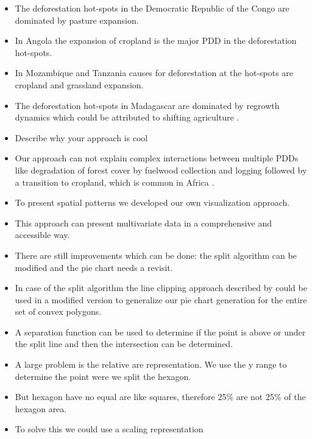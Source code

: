 \begin{itemize}
				\item The deforestation hot-spots in the Democratic Republic of the Congo are dominated by pasture expansion.
				\item In Angola the expansion of cropland is the major \ac{PDD} in the deforestation hot-spots.
				\item In Mozambique and Tanzania causes for deforestation at the hot-spots are cropland and grassland expansion.
				\item The deforestation hot-spots in Madagascar are dominated by regrowth dynamics which could be attributed to shifting agriculture \citep{Curtis2018}.

				\item Describe why your approach is cool
				\item Our approach can not explain complex interactions between multiple \acp{PDD} like degradation of forest cover by fuelwood collection and logging followed by a transition to cropland, which is common in Africa \citep{Geist2001,Cabral2011}.

				\item To present spatial patterns we developed our own visualization approach.
				\item This approach can present multivariate data in a comprehensive and accessible way.
				\item There are still improvements which can be done: the split algorithm can be modified and the pie chart needs a revisit.
				\item In case of the split algorithm the line clipping approach described by \citep{Skala1994} could be used in a modified version to generalize our pie chart generation for the entire set of convex polygons.
				\item A separation function can be used to determine if the point is above or under the split line and then the intersection can be determined.
				\item A large problem is the relative are representation. We use the y range to determine the point were we split the hexagon.
				\item But hexagon have no equal are like squares, therefore 25\% are not 25\% of the hexagon area.
				\item To solve this we could use a scaling representation
			\end{itemize}

